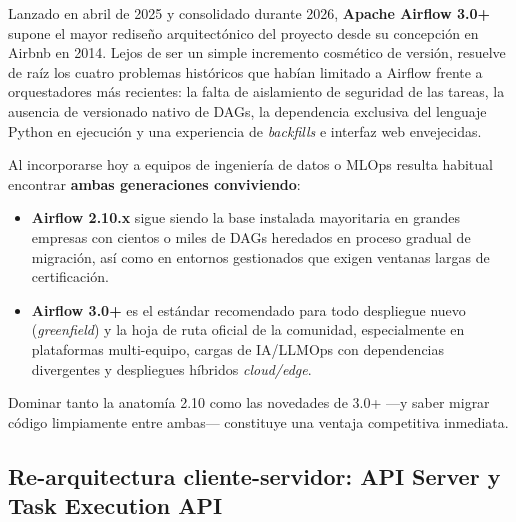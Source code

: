 Lanzado en abril de 2025 y consolidado durante 2026, \textbf{Apache Airflow 3.0+} supone el mayor rediseño arquitectónico del proyecto desde su concepción en Airbnb en 2014. Lejos de ser un simple incremento cosmético de versión, resuelve de raíz los cuatro problemas históricos que habían limitado a Airflow frente a orquestadores más recientes: la falta de aislamiento de seguridad de las tareas, la ausencia de versionado nativo de DAGs, la dependencia exclusiva del lenguaje Python en ejecución y una experiencia de \textit{backfills} e interfaz web envejecidas.

\begin{modernbox}
Al incorporarse hoy a equipos de ingeniería de datos o MLOps resulta habitual encontrar \textbf{ambas generaciones conviviendo}:
\begin{itemize}
  \item \textbf{Airflow 2.10.x} sigue siendo la base instalada mayoritaria en grandes empresas con cientos o miles de DAGs heredados en proceso gradual de migración, así como en entornos gestionados que exigen ventanas largas de certificación.
  \item \textbf{Airflow 3.0+} es el estándar recomendado para todo despliegue nuevo (\textit{greenfield}) y la hoja de ruta oficial de la comunidad, especialmente en plataformas multi-equipo, cargas de IA/LLMOps con dependencias divergentes y despliegues híbridos \textit{cloud/edge}.
\end{itemize}
Dominar tanto la anatomía 2.10 como las novedades de 3.0+ ---y saber migrar código limpiamente entre ambas--- constituye una ventaja competitiva inmediata.
\end{modernbox}

\subsection{Re-arquitectura cliente-servidor: API Server y Task Execution API}\label{subsec:task-execution-api}


